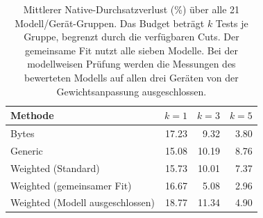 \begin{table}[t]
\centering
\small
\setlength{\tabcolsep}{3pt}
\caption{Mittlerer Native-Durchsatzverlust (\%) über alle 21 Modell/Gerät-Gruppen. Das Budget beträgt $k$ Tests je Gruppe, begrenzt durch die verfügbaren Cuts. Der gemeinsame Fit nutzt alle sieben Modelle. Bei der modellweisen Prüfung werden die Messungen des bewerteten Modells auf allen drei Geräten von der Gewichtsanpassung ausgeschlossen.}
\label{tab:weighted-budget}
\begin{tabular}{@{}l*{3}{D{.}{.}{2}}@{}}
\toprule
Methode &  &  &  \\
\midrule
Bytes & 17.23 & 9.32 & 3.80 \\
Generic & 15.08 & 10.19 & 8.76 \\
Weighted (Standard) & 15.73 & 10.01 & 7.37 \\
Weighted (gemeinsamer Fit) & 16.67 & 5.08 & 2.96 \\
Weighted (Modell ausgeschlossen) & 18.77 & 11.34 & 4.90 \\
\bottomrule
\end{tabular}
\end{table}
